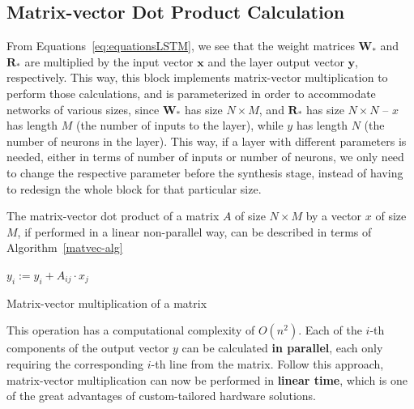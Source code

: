 \documentclass{IEEEtran}
\newcommand{\mb}[1]{\mathbf{#1}}
\begin{document}
\subsection{Matrix-vector Dot Product Calculation}\label{sec:proprarch_dot}
From Equations~\ref{eq:equationsLSTM}, we see that the weight matrices $\mb{W}_*$ and $\mb{R}_*$ are 
multiplied by the input vector $\mb{x}$ and the layer output vector $\mb{y}$, respectively. This way, 
this block implements matrix-vector multiplication to perform those calculations, and is parameterized in 
order to accommodate networks of various sizes, since $\mb{W}_*$ has size $N\times M$, and $\mb{R}_*$ 
has size $N\times N$ -- $x$ has length $M$ (the number of inputs to the layer), while $y$ has length $N$ 
(the number of neurons in the layer). This way, if a layer with different parameters is needed, either in terms of 
number of inputs or number of neurons, we only need to change the respective parameter before the synthesis stage, 
instead of having to redesign the whole block for that particular size. 

The matrix-vector dot product of a matrix $A$ of size $N \times M$ by a vector $x$ of size $M$, if performed in a linear non-parallel way, can be described in terms of Algorithm~\ref{matvec-alg}

\begin{algorithm}
\begin{algorithmic}
    \State $y_i := y_i + A_{ij} \cdot x_j$
    \EndFor
\EndFor
\end{algorithmic}
\caption{Matrix-vector multiplication of a matrix}
\label{matvec-alg}
\end{algorithm}
This operation has a computational complexity of $O(n^2)$. Each of the $i$-th components of the output vector $y$ can be calculated \textbf{in parallel}, each only requiring the corresponding $i$-th line from the matrix. Follow this approach, matrix-vector multiplication can now be performed in \textbf{linear time}, which is one of the great advantages of custom-tailored hardware solutions. 
\end{document}
